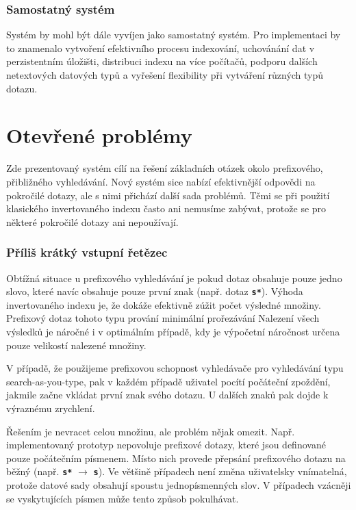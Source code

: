 \documentclass[11pt,letterpaper,oneside,openright]{book}
\newcommand{\bftt}[1]{\texttt{\textbf{#1}}}
\begin{document}
\subsubsection{Samostatný systém}
Systém by mohl být dále vyvíjen jako samostatný systém. Pro implementaci by to
znamenalo vytvoření efektivního procesu indexování, uchovánání dat v
perzistentním úložišti, distribuci indexu na více počítačů, podporu dalších
netextových datových typů a vyřešení flexibility při vytváření různých typů
dotazu.

\section{Otevřené problémy}
Zde prezentovaný systém cílí na řešení základních otázek okolo prefixového,
přibližného vyhledávání. Nový systém sice nabízí efektivnější odpovědi na
pokročilé dotazy, ale s nimi přichází další sada problémů. Těmi se při použití
klasického invertovaného indexu často ani nemusíme zabývat, protože se pro
některé pokročilé dotazy ani nepoužívají.

\subsubsection{Příliš krátký vstupní řetězec}
Obtížná situace u prefixového vyhledávání je pokud dotaz obsahuje pouze jedno
slovo, které navíc obsahuje pouze první znak (např. dotaz \bftt{s*}). Výhoda
invertovaného indexu je, že dokáže efektivně zúžit počet výsledné množiny.
Prefixový dotaz tohoto typu prování minimální prořezávání Nalezení všech
výsledků je náročné i v optimálním případě, kdy je výpočetní náročnost určena
pouze velikostí nalezené množiny.

V případě, že použijeme prefixovou schopnost vyhledávače pro vyhledávání typu
search-as-you-type, pak v každém případě uživatel pocítí počáteční zpoždění,
jakmile začne vkládat první znak svého dotazu. U dalších znaků pak dojde k
výraznému zrychlení.

Řešením je nevracet celou množinu, ale problém nějak omezit. Např.
implementovaný prototyp nepovoluje prefixové dotazy, které jsou definované
pouze počátečním písmenem. Místo nich provede přepsání prefixového dotazu na
běžný (např. \bftt{s*} $\rightarrow$ \bftt{s}). Ve většině případech není změna
uživatelsky vnímatelná, protože datové sady obsahují spoustu jednopísmenných
slov. V případech vzácněji se vyskytujících písmen může tento způsob
pokulhávat.
\end{document}
